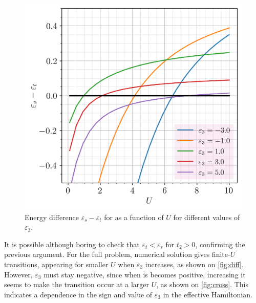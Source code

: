         \begin{figure}[h!]
            \centering
            \includegraphics[scale=0.65]{graphs/diff.png}
            \caption{Energy difference $\varepsilon_s - \varepsilon_t$ for as a function of $U$ for different values of $\varepsilon_3$.}
            \label{fig:diff}
        \end{figure}

        It is possible although boring to check that $\varepsilon_t<\varepsilon_s$ for $t_2>0$, confirming the previous argument. For the full problem, numerical solution gives finite-$U$ transitions, appearing for smaller $U$ when $\varepsilon_3$ increases, as shown on \autoref{fig:diff}. However, $\varepsilon_3$ must stay negative, since when is becomes positive, increasing it seems to make the transition occur at a larger $U$, as shown on \autoref{fig:cross}. This indicates a dependence in the sign and value of $\varepsilon_3$ in the effective Hamiltonian.
        
